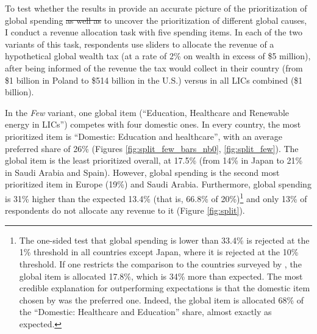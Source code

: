 \documentclass[12pt,english]{article}
\makeatletter
\providecommand{\DIFaddtex}[1]{{\protect\color{blue}\uwave{#1}}} %
\providecommand{\DIFdeltex}[1]{{\protect\color{red}\sout{#1}}} %
\providecommand{\DIFaddbegin}{} %
\providecommand{\DIFaddend}{} %
\providecommand{\DIFdelbegin}{} %
\providecommand{\DIFdelend}{} %
\providecommand{\DIFadd}[1]{\texorpdfstring{\DIFaddtex{#1}}{#1}} %
\providecommand{\DIFdel}[1]{\texorpdfstring{\DIFdeltex{#1}}{}} %
\providecommand{\DIFscaledelfig}{0.5}
\newlength{\DIFdelgraphicswidth} %
\newlength{\DIFdelgraphicsheight} %
\providecommand{\DIFaddincludegraphics}[2][]{{\color{blue}\fbox{\DIFOincludegraphics[#1]{#2}}}} %
\providecommand{\DIFdelincludegraphics}[2][]{%
\sbox{\DIFdelgraphicsbox}{\DIFOincludegraphics[#1]{#2}}%
\settoboxwidth{\DIFdelgraphicswidth}{\DIFdelgraphicsbox} %
\settoboxtotalheight{\DIFdelgraphicsheight}{\DIFdelgraphicsbox} %
\scalebox{\DIFscaledelfig}{%
\parbox[b]{\DIFdelgraphicswidth}{\usebox{\DIFdelgraphicsbox}\\[-\baselineskip] \rule{\DIFdelgraphicswidth}{0em}}\llap{\resizebox{\DIFdelgraphicswidth}{\DIFdelgraphicsheight}{%
\setlength{\unitlength}{\DIFdelgraphicswidth}%
\begin{picture}(1,1)%
\thicklines\linethickness{2pt} %
{\color[rgb]{1,0,0}\put(0,0){\framebox(1,1){}}}%
{\color[rgb]{1,0,0}\put(0,0){\line( 1,1){1}}}%
{\color[rgb]{1,0,0}\put(0,1){\line(1,-1){1}}}%
\end{picture}%
}\hspace*{3pt}}} %
} %
\DeclareRobustCommand{\DIFaddbegin}{\DIFOaddbegin \let\includegraphics\DIFaddincludegraphics} %
\DeclareRobustCommand{\DIFaddend}{\DIFOaddend \let\includegraphics\DIFOincludegraphics} %
\DeclareRobustCommand{\DIFdelbegin}{\DIFOdelbegin \let\includegraphics\DIFdelincludegraphics} %
\DeclareRobustCommand{\DIFdelend}{\DIFOaddend \let\includegraphics\DIFOincludegraphics} %
\let\sout@orig\sout %
\renewcommand{\sout}[1]{\ifmmode\text{\sout@orig{\ensuremath{#1}}}\else\sout@orig{#1}\fi} %
\makeatother
\begin{document}
To test whether the results in \cite{fabre_majority_2025} provide an accurate picture of the %
prioritization of global spending \DIFdelbegin \DIFdel{as well as }\DIFdelend \DIFaddbegin \DIFadd{and }\DIFaddend to uncover the prioritization of different global causes, I conduct a revenue allocation task with five spending items. 
In each of the two variants of this task, respondents use sliders to allocate the revenue of a hypothetical global wealth tax (at a rate of 2\% on wealth in excess of \$5 million), after being informed of the revenue the tax would collect in their country (from \$1 billion in Poland to \$514 billion in the U.S.) versus in all LICs combined (\$1 billion). 

In the \textit{Few} variant, one global item (``Education, Healthcare and Renewable energy in LICs'') competes with four domestic ones. %
In every country, the most prioritized item is ``Domestic: Education and healthcare'', with an average preferred share of 26\% (Figures \ref{fig:split_few_bars_nb0}, \ref{fig:split_few}). The global item is the least prioritized overall, at 17.5\% (from 14\% in Japan to 21\% in Saudi Arabia and Spain). However, global spending is the second most prioritized item in Europe (19\%) and Saudi Arabia. Furthermore, global spending is 31\% higher than the expected 13.4\% (that is, 66.8\% of %
20\%)\footnote{The one-sided test that global spending is lower than 33.4\% is rejected at the 1\% threshold in all countries except Japan, where it is rejected at the 10\% threshold. If one restricts the comparison to the countries surveyed by \cite{fabre_majority_2025}, the global item is allocated 17.8\%, which is 34\% more than expected. The most credible explanation for outperforming expectations is that the domestic item chosen by \cite{fabre_majority_2025} was the preferred one. Indeed, the global item is allocated 68\% of the ``Domestic: Healthcare and Education'' share, almost exactly as expected.} 
and only 13\% of respondents do not allocate any revenue to it (Figure \ref{fig:split}). 

\end{document}
